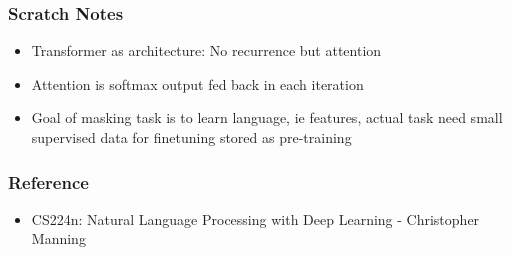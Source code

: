 \begin{frame}[fragile]\frametitle{Scratch Notes}

\begin{itemize}
\item Transformer as architecture: No recurrence but attention
\item Attention is softmax output fed back in each iteration
\item Goal of masking task is to learn language, ie features, actual task need small supervised data for finetuning  stored as pre-training

\end{itemize}
	  
\end{frame}

\begin{frame}[fragile]\frametitle{Reference}

\begin{itemize}
\item CS224n: Natural Language Processing with Deep Learning - Christopher Manning
\end{itemize}
	  
\end{frame}


	  





